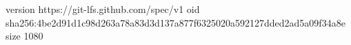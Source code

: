 version https://git-lfs.github.com/spec/v1
oid sha256:4be2d91d1c98d263a78a83d3d137a877f6325020a592127dded2ad5a09f34a8e
size 1080
